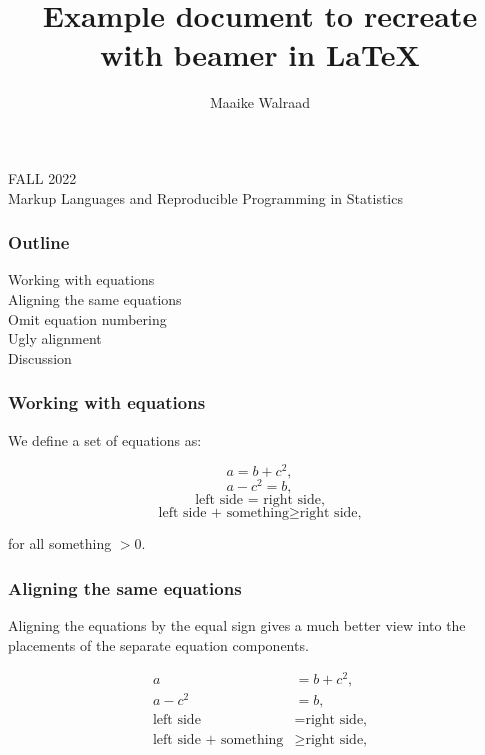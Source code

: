 \documentclass{beamer}
\title{Example document to recreate with beamer in \LaTeX}
\author{Maaike Walraad}
\date{}
\begin{document}
\begin{frame}
  \titlepage  
  \centering FALL 2022 \\ Markup Languages and Reproducible Programming in Statistics\par
\end{frame}

\begin{frame}
    \frametitle{Outline} 
    Working with equations \\
    \hspace{4.5mm} Aligning the same equations \\
    \hspace{4.5mm} Omit equation numbering \\
    \hspace{4.5mm} Ugly alignment \\
    \vspace{10mm}
    Discussion
\end{frame}

\begin{frame}
    \frametitle{Working with equations}
    \vspace{2mm}
    We define a set of equations as:
    
    \begin{equation}
    a = b + c^2,
    \end{equation}
    \begin{equation}
    a - c^2 = b,
    \end{equation}
    \begin{equation}
    \text{left side = right side,}
    \end{equation}
    \begin{equation}
    \text{left side + something} \geq \text{right side,}
    \end{equation}
    
    for all something $>{0}$.
\end{frame}

\begin{frame}
    \frametitle{Aligning the same equations}
    Aligning the equations by the equal sign gives a much better view into the placements
of the separate equation components.
    
    \begin{align} 
    a &= b + c^2, \\ 
    a - c^2 &= b, \\ 
    \text{left side} &= \text{right side,} \\ 
    \text{left side + something} &\geq \text{right side,}
    \end{align} 
\end{frame}
\end{document}

